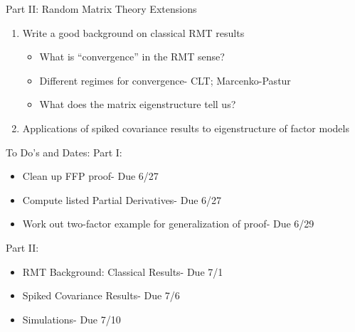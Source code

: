 \documentclass[11pt,leqno]{beamer}
\begin{document}
\begin{frame}{Part II: Random Matrix Theory Extensions}
\begin{enumerate}
\item Write a good background on classical RMT results
\begin{itemize}
\item What is ``convergence'' in the RMT sense?
\item Different regimes for convergence- CLT; Marcenko-Pastur
\item What does the matrix eigenstructure tell us?
\end{itemize}
\item Applications of spiked covariance results to eigenstructure of factor models 
\end{enumerate}
\end{frame}

\begin{frame}{To Do's and Dates:}
Part I:
\begin{itemize}
\item Clean up FFP proof- Due 6/27
\item Compute listed Partial Derivatives- Due 6/27
\item Work out two-factor example for generalization of proof- Due 6/29
\end{itemize}
Part II:
\begin{itemize}
\item RMT Background: Classical Results- Due 7/1
\item Spiked Covariance Results- Due 7/6
\item Simulations- Due 7/10
\end{itemize}
\end{frame}
\end{document}
